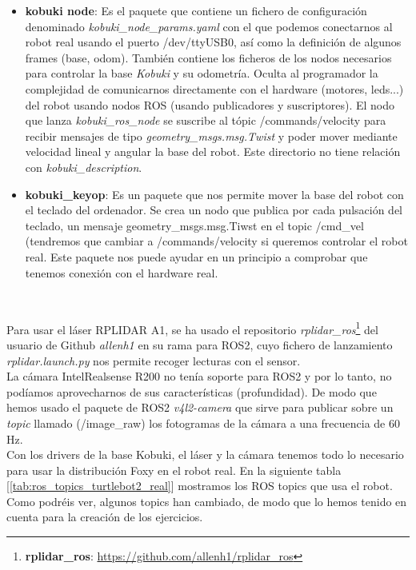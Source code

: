\begin{itemize}
	\item \textbf{kobuki node}: Es el paquete que contiene un fichero de configuración denominado \textit{kobuki\_node\_params.yaml} con el que podemos conectarnos al robot real usando el puerto /dev/ttyUSB0, así como la definición de algunos frames (base, odom). También contiene los ficheros de los nodos necesarios para controlar la base \textit{Kobuki} y su odometría. Oculta al programador la complejidad de comunicarnos directamente con el hardware (motores, leds...) del robot usando nodos ROS (usando publicadores y suscriptores). El nodo que lanza \textit{kobuki\_ros\_node} se suscribe al tópic /commands/velocity para recibir mensajes de tipo \textit{geometry\_msgs.msg.Twist} y poder mover mediante velocidad lineal y angular la base del robot. Este directorio no tiene relación con \textit{kobuki\_description}.
	\item \textbf{kobuki\_keyop}: Es un paquete que nos permite mover la base del robot con el teclado del ordenador. Se crea un nodo que publica por cada pulsación del teclado, un mensaje geometry\_msgs.msg.Tiwst en el topic /cmd\_vel (tendremos que cambiar a /commands/velocity si queremos controlar el robot real. Este paquete nos puede ayudar en un principio a comprobar que tenemos conexión con el hardware real.
\end{itemize}\

Para usar el láser RPLIDAR A1, se ha usado el repositorio \textit{rplidar\_ros}\footnote{\textbf{rplidar\_ros}: \url{https://github.com/allenh1/rplidar_ros}} del usuario de Github \textit{allenh1} en su rama para ROS2, cuyo fichero de lanzamiento \textit{rplidar.launch.py} nos permite recoger lecturas con el sensor.\\

La cámara IntelRealsense R200 no tenía soporte para ROS2 y por lo tanto, no podíamos aprovecharnos de sus características (profundidad). De modo que hemos usado el paquete de ROS2 \textit{v4l2-camera} que sirve para publicar sobre un \textit{topic} llamado (/image\_raw) los fotogramas de la cámara a una frecuencia de 60 Hz.\\

Con los drivers de la base Kobuki, el láser y la cámara tenemos todo lo necesario para usar la distribución Foxy en el robot real. En la siguiente tabla [\ref{tab:ros_topics_turtlebot2_real}] mostramos los ROS topics que usa el robot. Como podréis ver, algunos topics han cambiado, de modo que lo hemos tenido en cuenta para la creación de los ejercicios.\\

